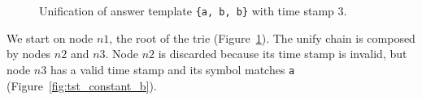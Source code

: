 \begin{figure}
   \qquad
    \\
   
   \qquad
    \\
   
   \caption{Unification of answer template \texttt{\{a,~b,~b\}} with time stamp 3.}
   \label{fig:tst_constant}
\end{figure}

We start on node $n1$, the root of the trie (Figure~\ref{fig:tst_constant}). The unify chain
is composed by nodes $n2$ and $n3$. Node $n2$ is discarded because its time stamp is invalid,
but node $n3$ has a valid time stamp and its symbol matches \texttt{a} (Figure~\ref{fig:tst_constant_b}).

